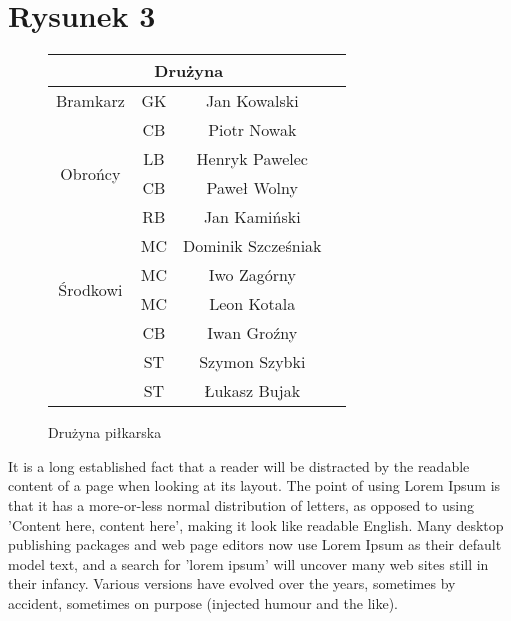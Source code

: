 \documentclass[a4paper,12pt]{article}
\begin{document}
	
	\section{Rysunek 3}
	\begin{SCfigure}[1.9]
		\begin{tabular}{ |c|c|c|c| } 
			\hline
			\multicolumn{3}{|c|}{Drużyna} \\
			\hline
			Bramkarz & GK & Jan Kowalski \\
			\hline
			\multirow{4}{4em}{Obrońcy} & CB & Piotr Nowak \\ 
			& LB & Henryk Pawelec \\ 
			& CB & Paweł Wolny \\ 
			& RB & Jan Kamiński \\ 
			\hline
			\multirow{4}{4em}{Środkowi} & MC  & Dominik Szcześniak \\ 
			& MC & Iwo Zagórny \\ 
			& MC & Leon Kotala \\
			\hline	
			\multirow{4}{5em}{Napastnicy} & CB & Iwan Groźny \\ 
			& ST & Szymon Szybki \\ 
			& ST & Łukasz Bujak \\ 
			\hline	
		\end{tabular}
		\caption{Drużyna piłkarska}
	\end{SCfigure}
	It is a long established fact that a reader will be distracted by the readable content of a page when looking at its layout. The point of using Lorem Ipsum is that it has a more-or-less normal distribution of letters, as opposed to using 'Content here, content here', making it look like readable English. Many desktop publishing packages and web page editors now use Lorem Ipsum as their default model text, and a search for 'lorem ipsum' will uncover many web sites still in their infancy. Various versions have evolved over the years, sometimes by accident, sometimes on purpose (injected humour and the like).
	
	
\end{document}
